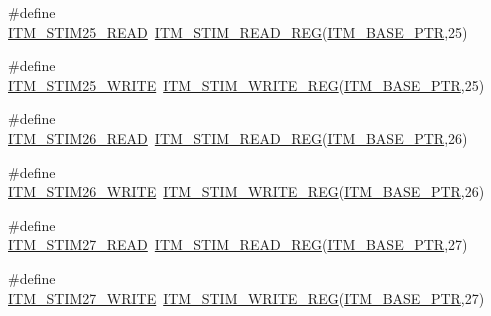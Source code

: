 \begin{DoxyCompactItemize}
\item 
\#define \hyperlink{group___i_t_m___register___accessor___macros_ga5e80b2d49c4833d6faa2843b39cc71e0}{I\+T\+M\+\_\+\+S\+T\+I\+M25\+\_\+\+R\+E\+AD}~\hyperlink{group___i_t_m___register___accessor___macros_ga5009882336aadcd4f37b45cf3395c450}{I\+T\+M\+\_\+\+S\+T\+I\+M\+\_\+\+R\+E\+A\+D\+\_\+\+R\+EG}(\hyperlink{group___i_t_m___peripheral_gafaddee8fe8b6a898d4e5edc43ee0d703}{I\+T\+M\+\_\+\+B\+A\+S\+E\+\_\+\+P\+TR},25)
\item 
\#define \hyperlink{group___i_t_m___register___accessor___macros_ga63f5197346498fb81ab45a43ebc85819}{I\+T\+M\+\_\+\+S\+T\+I\+M25\+\_\+\+W\+R\+I\+TE}~\hyperlink{group___i_t_m___register___accessor___macros_ga049ca92a4e78e77c19af81e51aa73f1c}{I\+T\+M\+\_\+\+S\+T\+I\+M\+\_\+\+W\+R\+I\+T\+E\+\_\+\+R\+EG}(\hyperlink{group___i_t_m___peripheral_gafaddee8fe8b6a898d4e5edc43ee0d703}{I\+T\+M\+\_\+\+B\+A\+S\+E\+\_\+\+P\+TR},25)
\item 
\#define \hyperlink{group___i_t_m___register___accessor___macros_ga8c35b9a8ec5da55c3822fd3960b46ffd}{I\+T\+M\+\_\+\+S\+T\+I\+M26\+\_\+\+R\+E\+AD}~\hyperlink{group___i_t_m___register___accessor___macros_ga5009882336aadcd4f37b45cf3395c450}{I\+T\+M\+\_\+\+S\+T\+I\+M\+\_\+\+R\+E\+A\+D\+\_\+\+R\+EG}(\hyperlink{group___i_t_m___peripheral_gafaddee8fe8b6a898d4e5edc43ee0d703}{I\+T\+M\+\_\+\+B\+A\+S\+E\+\_\+\+P\+TR},26)
\item 
\#define \hyperlink{group___i_t_m___register___accessor___macros_ga56f074bfff0348baad454e7fba80c007}{I\+T\+M\+\_\+\+S\+T\+I\+M26\+\_\+\+W\+R\+I\+TE}~\hyperlink{group___i_t_m___register___accessor___macros_ga049ca92a4e78e77c19af81e51aa73f1c}{I\+T\+M\+\_\+\+S\+T\+I\+M\+\_\+\+W\+R\+I\+T\+E\+\_\+\+R\+EG}(\hyperlink{group___i_t_m___peripheral_gafaddee8fe8b6a898d4e5edc43ee0d703}{I\+T\+M\+\_\+\+B\+A\+S\+E\+\_\+\+P\+TR},26)
\item 
\#define \hyperlink{group___i_t_m___register___accessor___macros_gad396bfbe5ecd26d08ddcdeb9102e28d2}{I\+T\+M\+\_\+\+S\+T\+I\+M27\+\_\+\+R\+E\+AD}~\hyperlink{group___i_t_m___register___accessor___macros_ga5009882336aadcd4f37b45cf3395c450}{I\+T\+M\+\_\+\+S\+T\+I\+M\+\_\+\+R\+E\+A\+D\+\_\+\+R\+EG}(\hyperlink{group___i_t_m___peripheral_gafaddee8fe8b6a898d4e5edc43ee0d703}{I\+T\+M\+\_\+\+B\+A\+S\+E\+\_\+\+P\+TR},27)
\item 
\#define \hyperlink{group___i_t_m___register___accessor___macros_gae1575242a2ddb0a6d0089f2f49072265}{I\+T\+M\+\_\+\+S\+T\+I\+M27\+\_\+\+W\+R\+I\+TE}~\hyperlink{group___i_t_m___register___accessor___macros_ga049ca92a4e78e77c19af81e51aa73f1c}{I\+T\+M\+\_\+\+S\+T\+I\+M\+\_\+\+W\+R\+I\+T\+E\+\_\+\+R\+EG}(\hyperlink{group___i_t_m___peripheral_gafaddee8fe8b6a898d4e5edc43ee0d703}{I\+T\+M\+\_\+\+B\+A\+S\+E\+\_\+\+P\+TR},27)

\end{DoxyCompactItemize}
